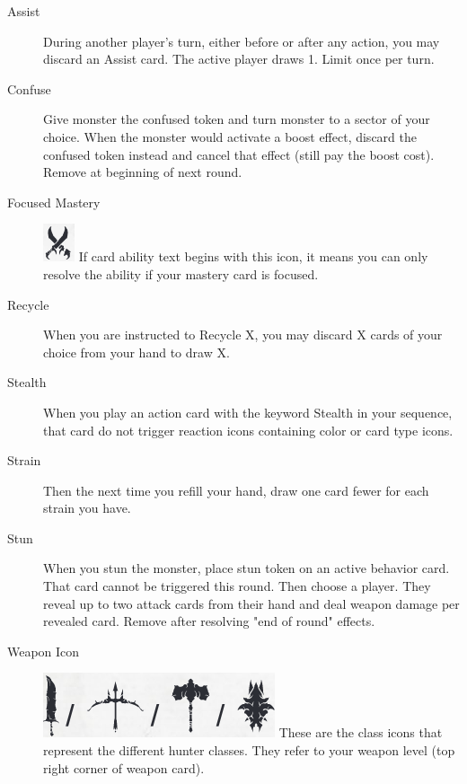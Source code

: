 \documentclass[12pt]{article}
\begin{document}
\begin{mdframed}[style=SummaryCard, align=center, userdefinedwidth=35em, frametitle={Important Keywords (Thoreg)}]
    \begin{description}
        \item[Assist] During another player’s turn, either before or after any action, you may discard an Assist card. The active player draws 1. Limit once per turn.
        \item[Confuse] Give monster the confused token and turn monster to a sector of your choice. When the monster would activate a boost effect, discard the confused token instead and cancel that effect (still pay the boost cost). Remove at beginning of next round.
        \item[Focused Mastery] \includegraphics[scale=0.30]{images/mastery_icon.png} If card ability text begins with this icon, it means you can only resolve the ability if your mastery card is focused.
        \item[Recycle] When you are instructed to Recycle X, you may discard X cards of your choice from your hand to draw X.
        \item[Stealth] When you play an action card with the keyword Stealth in your sequence, that card do not trigger reaction icons containing color or card type icons.
        \item[Strain] Then the next time you refill your hand, draw one card fewer for each strain you have.
        \item[Stun] When you stun the monster, place stun token on an active behavior card. That card cannot be triggered this round. Then choose a player. They reveal up to two attack cards from their hand and deal weapon damage per revealed card. Remove after resolving "end of round" effects.
        \item[Weapon Icon] \includegraphics[scale=0.20]{images/weapon_level.png} These are the class icons that represent the different hunter classes. They refer to your weapon level (top right corner of weapon card).
    \end{description}
\end{mdframed}
\end{document}
